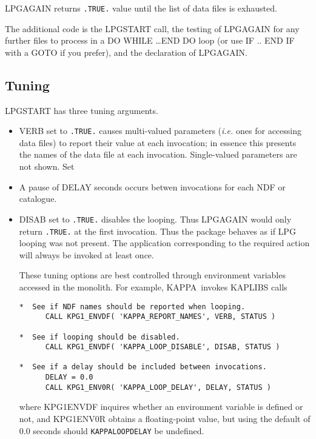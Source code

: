 \documentclass[twoside,11pt]{article}
\newcommand{\htmlref}[2]{#1}
\newcommand{\xref}[3]{#1}
\renewcommand{\_}{\texttt{\symbol{95}}}
\newcommand{\KAPPA}{{\footnotesize KAPPA}\normalsize}
\newcommand{\KAPPAref}{\xref{{\KAPPA}}{sun95}{}}
\begin{document}
LPG\_AGAIN returns {\tt .TRUE.} value until the list of data files is
exhausted.

The additional code is the \htmlref{LPG\_START}{LPG_START} call, the
testing of \htmlref{LPG\_AGAIN}{LPG_AGAIN} for any further files to
process in a DO WHILE \ldots END DO loop (or use IF .. END IF with a
GOTO if you prefer), and the declaration of LPG\_AGAIN.

\subsection{Tuning}

LPG\_START has three tuning arguments.

\begin{itemize}

\item
VERB set to {\tt .TRUE.} causes multi-valued parameters (\emph{i.e.}
ones for accessing data files) to report their value at each
invocation; in essence this presents the names of the data file at
each invocation.  Single-valued parameters are not shown.  Set

\item
A pause of DELAY seconds occurs betwen invocations for each NDF or
catalogue.

\item
DISAB set to {\tt .TRUE.} disables the looping.  Thus LPG\_AGAIN
would only return {\tt .TRUE.} at the first invocation.  Thus the
package behaves as if LPG looping was not present.
The application corresponding to the required action will always be
invoked at least once.

These tuning options are best controlled through environment variables
accessed in the monolith.  For example, \KAPPAref\ invokes
\xref{KAPLIBS}{sun238}{} calls

\small
\begin{verbatim}
*  See if NDF names should be reported when looping.
      CALL KPG1_ENVDF( 'KAPPA_REPORT_NAMES', VERB, STATUS )

*  See if looping should be disabled.
      CALL KPG1_ENVDF( 'KAPPA_LOOP_DISABLE', DISAB, STATUS )

*  See if a delay should be included between invocations.
      DELAY = 0.0
      CALL KPG1_ENV0R( 'KAPPA_LOOP_DELAY', DELAY, STATUS )
\end{verbatim}
\normalsize

where \xref{KPG1\_ENVDF}{sun238}{KPG1_ENVDF} inquires whether an environment
variable is defined or not, and \xref{KPG1\_ENV0R}{sun238}{KPG1_ENV0R}
obtains a floating-point value, but using the default of 0.0 seconds
should {\tt KAPPA\_LOOP\_DELAY} be undefined.

\end{itemize}
\end{document}
